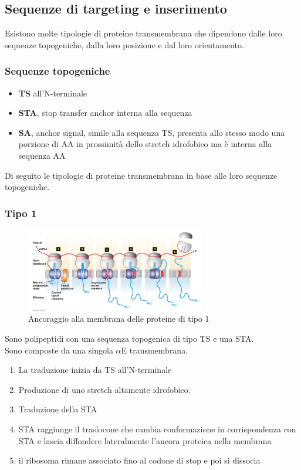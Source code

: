     \subsection{Sequenze di targeting e inserimento}
        Esistono molte tipologie di proteine transmembrana che dipendono dalle loro sequenze topogeniche, dalla loro posizione e dal loro orientamento. 
        \subsubsection{Sequenze topogeniche}
            \begin{itemize}
                \item \textbf{TS} all'N-terminale
                \item \textbf{STA}, stop transfer anchor interna alla sequenza
                \item \textbf{SA}, anchor signal, simile alla sequenza TS, presenta allo stesso modo una porzione di AA in prossimità dello stretch idrofobico ma è interna alla sequenza AA
            \end{itemize}
            Di seguito le tipologie di proteine transmembrana in base alle loro sequenze topogeniche.
        
        \subsubsection{Tipo 1}
            \begin{figure}[h]
                \centering
                \includegraphics[width=0.7\textwidth]{images/Tipo1.JPG}
                \caption{\small Ancoraggio alla membrana delle proteine di tipo 1}
                \label{fig:mesh1}
            \end{figure}
            Sono polipeptidi con una sequenza topogenica di tipo TS e una STA.\\
            Sono composte da una singola $\alpha$E transmembrana. \\
            \begin{enumerate}
                \item La traduzione inizia da TS all'N-terminale
                \item Produzione di uno stretch altamente idrofobico.
                \item Traduzione della STA
                \item STA raggiunge il traslocone che cambia conformazione in corrispondenza con STA e lascia diffondere lateralmente l'ancora proteica nella membrana
                \item il ribosoma rimane associato fino al codone di stop e poi si dissocia
            \end{enumerate}
            
